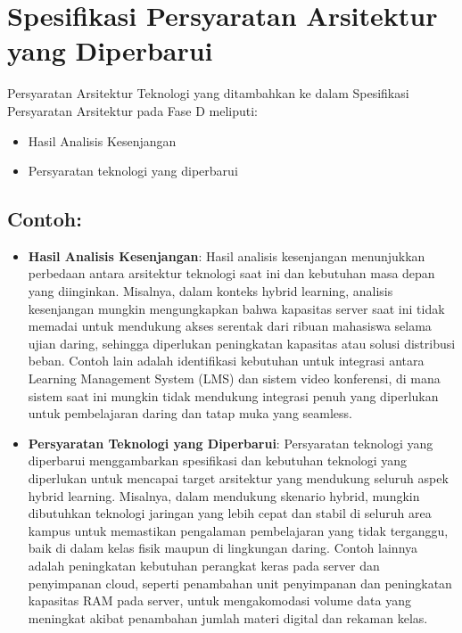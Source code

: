 \section{Spesifikasi Persyaratan Arsitektur yang Diperbarui}
Persyaratan Arsitektur Teknologi yang ditambahkan ke dalam Spesifikasi Persyaratan Arsitektur pada Fase D meliputi:
\begin{itemize}
	\item Hasil Analisis Kesenjangan
	\item Persyaratan teknologi yang diperbarui
\end{itemize}

\subsection*{Contoh:}

\begin{itemize}
	\item \textbf{Hasil Analisis Kesenjangan}: Hasil analisis kesenjangan menunjukkan perbedaan antara arsitektur teknologi saat ini dan kebutuhan masa depan yang diinginkan. Misalnya, dalam konteks hybrid learning, analisis kesenjangan mungkin mengungkapkan bahwa kapasitas server saat ini tidak memadai untuk mendukung akses serentak dari ribuan mahasiswa selama ujian daring, sehingga diperlukan peningkatan kapasitas atau solusi distribusi beban. Contoh lain adalah identifikasi kebutuhan untuk integrasi antara Learning Management System (LMS) dan sistem video konferensi, di mana sistem saat ini mungkin tidak mendukung integrasi penuh yang diperlukan untuk pembelajaran daring dan tatap muka yang seamless.
	
	\item \textbf{Persyaratan Teknologi yang Diperbarui}: Persyaratan teknologi yang diperbarui menggambarkan spesifikasi dan kebutuhan teknologi yang diperlukan untuk mencapai target arsitektur yang mendukung seluruh aspek hybrid learning. Misalnya, dalam mendukung skenario hybrid, mungkin dibutuhkan teknologi jaringan yang lebih cepat dan stabil di seluruh area kampus untuk memastikan pengalaman pembelajaran yang tidak terganggu, baik di dalam kelas fisik maupun di lingkungan daring. Contoh lainnya adalah peningkatan kebutuhan perangkat keras pada server dan penyimpanan cloud, seperti penambahan unit penyimpanan dan peningkatan kapasitas RAM pada server, untuk mengakomodasi volume data yang meningkat akibat penambahan jumlah materi digital dan rekaman kelas.
\end{itemize}

